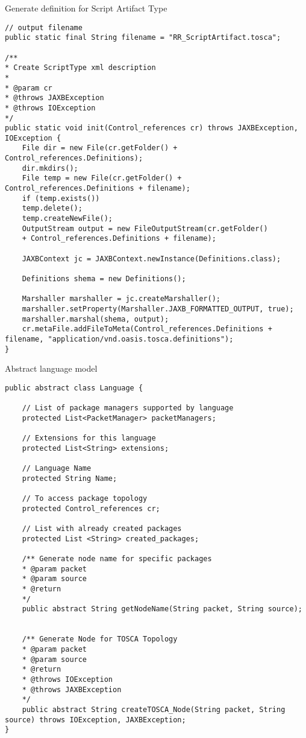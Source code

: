 \begin{Listing} 
	\caption{Generate definition for Script Artifact Type}
	\label{lst:scripttype_create}
	\begin{lstlisting}
// output filename
public static final String filename = "RR_ScriptArtifact.tosca";

/**
* Create ScriptType xml description
* 
* @param cr
* @throws JAXBException
* @throws IOException
*/
public static void init(Control_references cr) throws JAXBException,
IOException {
	File dir = new File(cr.getFolder() + Control_references.Definitions);
	dir.mkdirs();
	File temp = new File(cr.getFolder() + Control_references.Definitions + filename);
	if (temp.exists())
	temp.delete();
	temp.createNewFile();
	OutputStream output = new FileOutputStream(cr.getFolder()
	+ Control_references.Definitions + filename);
	
	JAXBContext jc = JAXBContext.newInstance(Definitions.class);
	
	Definitions shema = new Definitions();
	
	Marshaller marshaller = jc.createMarshaller();
	marshaller.setProperty(Marshaller.JAXB_FORMATTED_OUTPUT, true);
	marshaller.marshal(shema, output);
	cr.metaFile.addFileToMeta(Control_references.Definitions + filename, "application/vnd.oasis.tosca.definitions");
}
\end{lstlisting}
\end{Listing}
\begin{Listing}
\caption{Abstract language model}
\label{lst:langabst}
\begin{lstlisting}
public abstract class Language {
	
	// List of package managers supported by language
	protected List<PacketManager> packetManagers;
	
	// Extensions for this language
	protected List<String> extensions;
	
	// Language Name
	protected String Name;
	
	// To access package topology
	protected Control_references cr;
	
	// List with already created packages
	protected List <String> created_packages;

	/**	Generate node name for specific packages
	* @param packet
	* @param source
	* @return
	*/
	public abstract String getNodeName(String packet, String source);
	
	
	/**	Generate Node for TOSCA Topology
	* @param packet
	* @param source
	* @return
	* @throws IOException
	* @throws JAXBException
	*/
	public abstract String createTOSCA_Node(String packet, String source) throws IOException, JAXBException;
}
\end{lstlisting}
\end{Listing}

